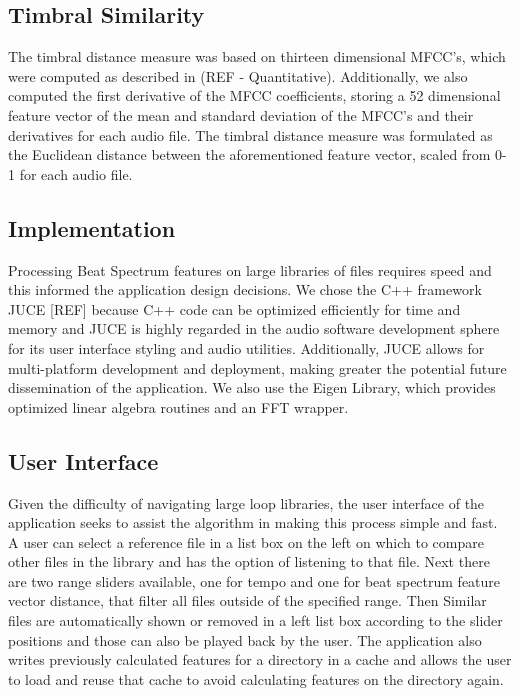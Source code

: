 \documentclass{article}
\begin{document}
\subsection{Timbral Similarity}

The timbral distance measure was based on thirteen dimensional MFCC’s, which were computed as described in (REF - Quantitative). Additionally, we also computed the first derivative of the MFCC coefficients, storing a 52 dimensional feature vector of the mean and standard deviation of the MFCC’s and their derivatives for each audio file. The timbral distance measure was formulated as the Euclidean distance between the aforementioned feature vector, scaled from 0-1 for each audio file.

\subsection{Implementation}

Processing Beat Spectrum features on large libraries of files requires speed and this informed the application design decisions. We chose the C++ framework JUCE [REF] because C++ code can be optimized efficiently for time and memory and JUCE is highly regarded in the audio software development sphere for its user interface styling and audio utilities. Additionally, JUCE allows for multi-platform development and deployment, making greater the potential future dissemination of the application. We also use the Eigen Library, which provides optimized linear algebra routines and an FFT wrapper.

\subsection{User Interface}
Given the difficulty of navigating large loop libraries, the user interface of the application seeks to assist the algorithm in making this process simple and fast. A user can select a reference file in a list box on the left on which to compare other files in the library and has the option of listening to that file. Next there are two range sliders available, one for tempo and one for beat spectrum feature vector distance, that filter all files outside of the specified range. Then Similar files are automatically shown or removed in a left list box according to the slider positions and those can also be played back by the user. The application also writes previously calculated features for a directory in a cache and allows the user to load and reuse that cache to avoid calculating features on the directory again.
\end{document}
